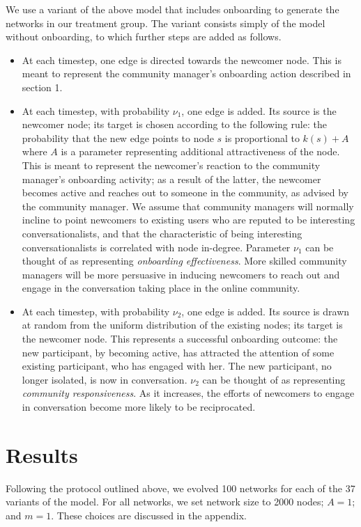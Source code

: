 \documentclass{nws}
\begin{document}
We use a variant of the above model that includes onboarding to generate the networks in our treatment group. The variant consists simply of the model without onboarding, to which further steps are added as follows.
\begin{itemize}
\item At each timestep, one edge is directed towards the newcomer node. This is meant to represent the community manager's onboarding action described in section 1. 
\item At each timestep, with probability $\nu_1$, one edge is added. Its source is the newcomer node; its target is chosen according to the following rule: the probability that the new edge points to node $s$ is proportional to $k(s) + A$ where $A$ is a parameter representing additional attractiveness of the node. This is meant to represent the newcomer's reaction to the community manager's onboarding activity; as a result of the latter, the newcomer becomes active and reaches out to someone in the community, as advised by the community manager. We assume that community managers will normally incline to point newcomers to existing users who are reputed to be interesting conversationalists, and that the characteristic of being interesting conversationalists is correlated with node in-degree. Parameter $\nu_1$ can be thought of as representing \emph{onboarding effectiveness}. More skilled community managers will be more persuasive in inducing newcomers to reach out and engage in the conversation taking place in the online community.
\item At each timestep, with probability $\nu_2$, one edge is added. Its source is drawn at random from the uniform distribution of the existing nodes; its target is the newcomer node. This represents a successful onboarding outcome: the new participant, by becoming active, has attracted the attention of some existing participant, who has engaged with her. The new participant, no longer isolated, is now in conversation. $\nu_2$ can be thought of as representing \emph{community responsiveness}. As it increases, the efforts of newcomers to engage in conversation become more likely to be reciprocated.
\end{itemize}


\section{Results} \label{sec:results}
Following the protocol outlined above, we evolved 100 networks for each of the 37 variants of the model. For all networks, we set network size to 2000 nodes; $A = 1$; and $m = 1$. These choices are discussed in the appendix.
\end{document}
